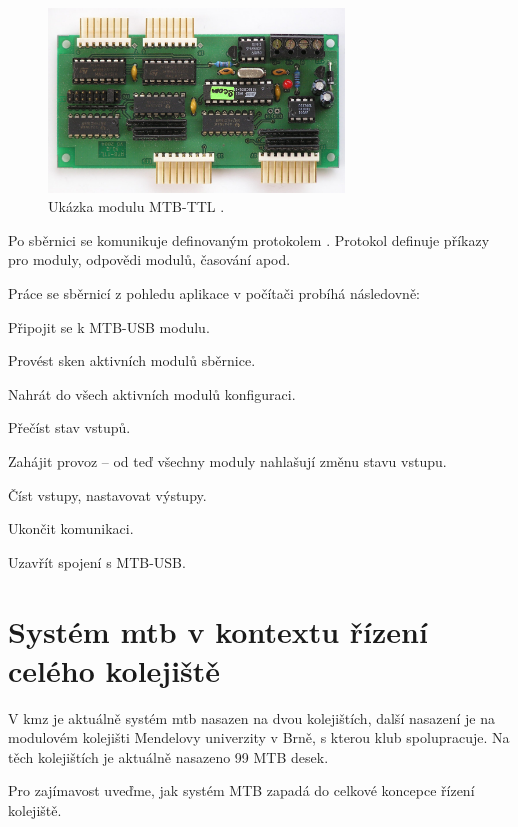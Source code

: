 \begin{figure}[ht]
\includegraphics[width=0.7\textwidth]{data/mtbttl_foto.jpg}
\caption{Ukázka modulu MTB-TTL \cite{mtb:web}.}
\label{fig:mtbttl}
\end{figure}

Po sběrnici se komunikuje definovaným protokolem \cite{mtbbus-proto}. Protokol
definuje příkazy pro moduly, odpovědi modulů, časování apod.

Práce se sběrnicí z pohledu aplikace v počítači probíhá následovně:

\begin{compactenum}
\item Připojit se k MTB-USB modulu.
\item Provést sken aktivních modulů sběrnice.
\item Nahrát do všech aktivních modulů konfiguraci.
\item Přečíst stav vstupů.
\item Zahájit provoz – od teď všechny moduly nahlašují změnu stavu vstupu.
\item Číst vstupy, nastavovat výstupy.
\item Ukončit komunikaci.
\item Uzavřít spojení s MTB-USB.
\end{compactenum}

\section{Systém \gls{mtb} v kontextu řízení celého kolejiště} \label{sec:mtb_context}

V \gls{kmz} je aktuálně systém \gls{mtb} nasazen na dvou kolejištích, další
nasazení je na modulovém kolejišti Mendelovy univerzity v Brně, s kterou klub
spolupracuje. Na těch kolejištích je aktuálně nasazeno 99 MTB desek.

Pro zajímavost uveďme, jak systém MTB zapadá do celkové koncepce řízení
kolejiště.

